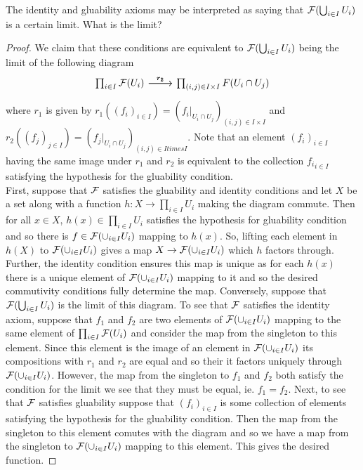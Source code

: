 \begin{exercise}
    The identity and gluability axioms may be interpreted as saying that $\mathcal{F}(\bigcup_{i \in I}U_i)$ is a certain limit. What is the limit? 
\end{exercise}

\begin{proof}
    We claim that these conditions are equivalent to $\mathcal{F}(\bigcup_{i \in I}U_i)$ being the limit of the following diagram 
    \[ \begin{tikzcd} 
        \prod_{i \in I} \cF(U_i) \arrow[r, "r_1"] \arrow[r, "r_2"] & \prod_{(i, j) \in I \times I} F(U_i \cap U_j) 
    \end{tikzcd}\] 
    where $r_1$ is given by $r_1( (f_i)_{i \in I}) = (f_i|_{U_i \cap U_j})_{(i, j) \in I \times I}$ and $r_2( (f_j)_{j \in I}) = (f_j|_{U_i \cap U_j})_{(i, j) \in I times I}$. Note that an element $(f_i)_{i \in I}$ having the same image under $r_1$ and $r_2$ is equivalent to the collection ${f_i}_{i \in I}$ satisfying the hypothesis for the gluability condition. \\
    First, suppose that $\mathcal{F}$ satisfies the gluability and identity conditions and let $X$ be a set along with a function $h: X \to \prod_{i \in I} U_i$ making the diagram commute. Then for all $x \in X$, $h(x) \in \prod_{i \in I} U_i$ satisfies the hypothesis for gluability condition and so there is $f \in \mathcal{F}(\cup_{i \in I}U_i)$ mapping to $h(x)$. So, lifting each element in $h(X)$ to $\mathcal{F}(\cup_{i \in I}U_i)$ gives a map $X \to \mathcal{F}(\cup_{i \in I}U_i)$ which $h$ factors through. Further, the identity condition ensures this map is unique as for each $h(x)$ there is a unique element of $\mathcal{F}(\cup_{i \in I}U_i)$ mapping to it and so the desired commutivity conditions fully determine the map. 
    Conversely, suppose that $\mathcal{F}( \bigcup_{i \in I}U_i)$ is the limit of this diagram. To see that $\mathcal{F}$ satisfies the identity axiom, suppose that $f_1$ and $f_2$ are two elements of $\mathcal{F}(\cup_{i \in I}U_i)$ mapping to the same element of $\prod_{i \in I} \mathcal{F}(U_i)$ and consider the map from the singleton to this element. Since this element is the image of an element in $\mathcal{F}(\cup_{i \in I}U_i)$ its compositions with $r_1$ and $r_2$ are equal and so their it factors uniquely through $\mathcal{F}(\cup_{i \in I}U_i)$. However, the map from the singleton to $f_1$ and $f_2$ both satisfy the condition for the limit we see that they must be equal, ie. $f_1 = f_2$. Next, to see that $\mathcal{F}$ satisfies gluability suppose that $(f_i)_{i \in I}$ is some collection of elements satisfying the hypothesis for the gluability condition. Then the map from the singleton to this element comutes with the diagram and so we have a map from the singleton to $\mathcal{F}(\cup_{i \in I}U_i)$ mapping to this element. This gives the desired function. 
\end{proof}

